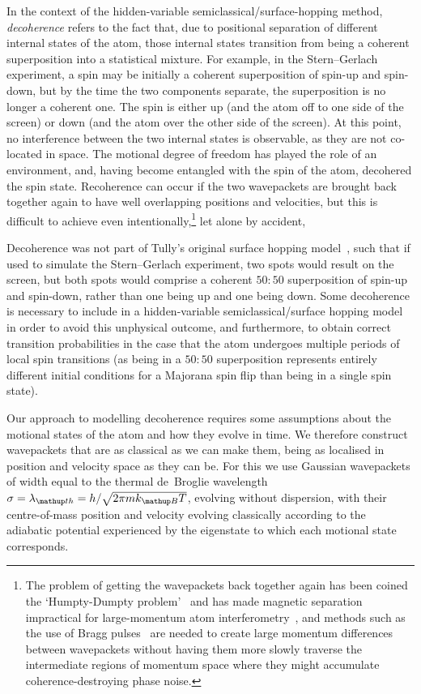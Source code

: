 In the context of the hidden-variable semiclassical/surface-hopping method, \emph{decoherence} refers to the fact that, due to positional separation of different internal states of the atom, those internal states transition from being a coherent superposition into a statistical mixture. For example, in the Stern--Gerlach experiment, a spin may be initially a coherent superposition of spin-up and spin-down, but by the time the two components separate, the superposition is no longer a coherent one. The spin is either up (and the atom off to one side of the screen) or down (and the atom over the other side of the screen). At this point, no interference between the two internal states is observable, as they are not co-located in space. The motional degree of freedom has played the role of an environment, and, having become entangled with the spin of the atom, decohered the spin state. Recoherence can occur if the two wavepackets are brought back together again to have well overlapping positions and velocities, but this is difficult to achieve even intentionally,\footnote{The problem of getting the wavepackets back together again has been coined the `Humpty-Dumpty problem'~\cite{Schwinger1988, doi:10.1063/1.459170} and has made magnetic separation impractical for large-momentum atom interferometry~\cite{machluf_coherent_2013}, and methods such as the use of Bragg pulses~\cite{PhysRevLett.66.2693, PhysRevLett.75.2633} are needed to create large momentum differences between wavepackets without having them more slowly traverse the intermediate regions of momentum space where they might accumulate coherence-destroying phase noise.} let alone by accident, 

Decoherence was not part of Tully's original surface hopping model~\cite{doi:10.1063/1.459170}, such that if used to simulate the Stern--Gerlach experiment, two spots would result on the screen, but both spots would comprise a coherent $50:50$ superposition of spin-up and spin-down, rather than one being up and one being down. Some decoherence is necessary to include in a hidden-variable semiclassical/surface hopping model in order to avoid this unphysical outcome, and furthermore, to obtain correct transition probabilities in the case that the atom undergoes multiple periods of local spin transitions (as being in a $50:50$ superposition represents entirely different initial conditions for a Majorana spin flip than being in a single spin state).

Our approach to modelling decoherence requires some assumptions about the motional states of the atom and how they evolve in time. We therefore construct wavepackets that are as classical as we can make them, being as localised in position and velocity space as they can be. For this we use Gaussian wavepackets of width equal to the thermal de~Broglie wavelength $\sigma = \lambda_\up{th} = h/\sqrt{2\pi m k_\up{B} T}$, evolving without dispersion, with their centre-of-mass position and velocity evolving classically according to the adiabatic potential experienced by the eigenstate to which each motional state corresponds.

